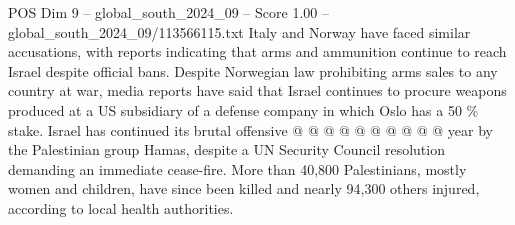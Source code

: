 \begin{textsample}{POS Dim 9 – global\_south\_2024\_09 – Score 1.00 – global\_south\_2024\_09/113566115.txt}
Italy and Norway have faced similar accusations, with reports indicating that arms and ammunition continue to reach Israel despite official bans.
Despite Norwegian law prohibiting arms sales to any country at war, media reports have said that Israel continues to procure weapons produced at a US subsidiary of a defense company in which Oslo has a 50 \% stake.
Israel has continued its brutal offensive @ @ @ @ @ @ @ @ @ @ year by the Palestinian group Hamas, despite a UN Security Council resolution demanding an immediate cease-fire.
More than 40,800 Palestinians, mostly women and children, have since been killed and nearly 94,300 others injured, according to local health authorities.

\end{textsample}
